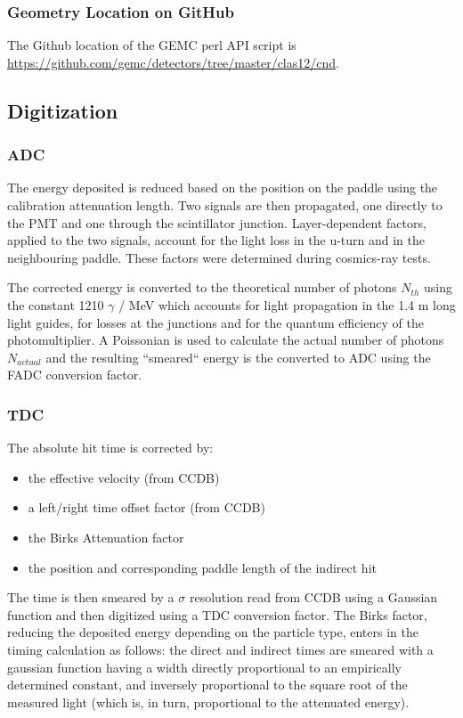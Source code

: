 \subsubsection{Geometry Location on GitHub}
The Github location of the GEMC perl API script is \url{https://github.com/gemc/detectors/tree/master/clas12/cnd}.


\subsection{Digitization}

\subsubsection{ADC}

The energy deposited is reduced based on the position on the paddle using the calibration attenuation length. Two signals are then propagated, one directly
to the PMT and one through the scintillator junction.
Layer-dependent factors, applied to the two  signals, account for the light loss in the u-turn and in the neighbouring paddle.
These factors were determined during cosmics-ray tests.

The corrected energy is converted to the theoretical number of photons $N_{th}$ using the constant 1210 $\gamma$ / MeV which accounts for light
propagation in the 1.4 m long light guides, for losses at the junctions and for the quantum efficiency of the photomultiplier.
A Poissonian is used to
calculate the actual number of photons $N_{actual}$ and the resulting ``smeared`` energy is the converted to ADC using the FADC conversion factor.

\subsubsection{TDC}

The absolute hit time is corrected by:

\begin{itemize}
	\item the effective velocity (from CCDB)
	\item a left/right time offset factor (from CCDB)
	\item the Birks Attenuation factor
	\item the position and corresponding paddle length of the indirect hit
\end{itemize}

The time is then smeared by a $\sigma$ resolution read from CCDB using a Gaussian function and then digitized using a TDC conversion factor.
The Birks factor, reducing the deposited
energy depending on the particle type, enters in the timing calculation as
follows: the direct and indirect times are smeared with a gaussian
function having a width directly proportional to an empirically determined
constant, and inversely proportional to the square root of the measured
light (which is, in turn, proportional to the attenuated energy).

